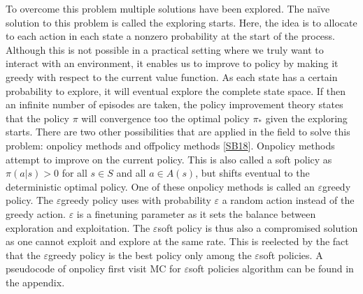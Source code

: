 \documentclass[letterpaper,10pt,english]{jupyterBook}
\begin{document}
\sphinxAtStartPar
To overcome this problem multiple solutions have been explored. The naïve solution to this problem is called the exploring starts. Here, the idea is to allocate to each action in each state a nonzero probability at the start of the process. Although this is not possible in a practical setting where we truly want to interact with an environment, it enables us to improve to policy by making it greedy with respect to the current value function. As each state has a certain probability to explore, it will eventual explore the complete state space. If then an infinite number of episodes are taken, the policy improvement theory states that the policy \(\pi\) will convergence too the optimal policy \(\pi_*\) given the exploring starts. There are two other possibilities that are applied in the field to solve this problem: on\sphinxhyphen{}policy methods and off\sphinxhyphen{}policy methods {[}\hyperlink{cite.Financial_application:id70}{SB18}{]}. On\sphinxhyphen{}policy methods attempt to improve on the current policy. This is also called a soft policy as \(\pi(a|s) > 0\) for all \(s \in S\) and all \( a \in A(s)\), but shifts eventual to the deterministic optimal policy. One of these on\sphinxhyphen{}policy methods is called an \(\varepsilon\)\sphinxhyphen{}greedy policy. The \(\varepsilon\)\sphinxhyphen{}greedy policy uses with probability \(\varepsilon\) a random action instead of the greedy action. \(\varepsilon\) is a fine\sphinxhyphen{}tuning parameter as it sets the balance between exploration and exploitation. The \(\varepsilon\)\sphinxhyphen{}soft policy is thus also a compromised solution as one cannot exploit and explore at the same rate. This is reelected by the fact that the \(\varepsilon\)\sphinxhyphen{}greedy policy  is the best policy only among the \(\varepsilon\)\sphinxhyphen{}soft policies. A pseudocode of on\sphinxhyphen{}policy first visit MC for \(\varepsilon\)\sphinxhyphen{}soft policies algorithm can be found in the appendix.
\end{document}
